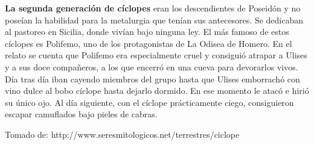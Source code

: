 \textbf{La segunda generación de cíclopes} eran los descendientes de Poseidón y no poseían la habilidad para la metalurgia que tenían sus antecesores. Se dedicaban al pastoreo en Sicilia, donde vivían bajo ninguna ley.
El más famoso de estos cíclopes es Polifemo, uno de los protagonistas de La Odisea de Homero. En el relato se cuenta que Polifemo era especialmente cruel y consiguió atrapar a Ulises y a sus doce compañeros, a los que encerró en una cueva para devorarlos vivos. Día tras día iban cayendo miembros del grupo hasta que Ulises emborrachó con vino dulce al bobo cíclope hasta dejarlo dormido. En ese momento le atacó e hirió su único ojo. Al día siguiente, con el cíclope prácticamente ciego, consiguieron escapar camuflados bajo pieles de cabras. 
\begin{flushright}
{\footnotesize Tomado de:}
{\footnotesize  http://www.seresmitologicos.net/terrestres/ciclope}
\end{flushright}

